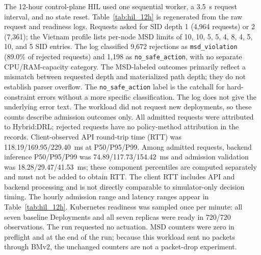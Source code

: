 \documentclass[final,5p]{elsarticle}
\newcommand{\rev}[1]{\textcolor{revisiongreen}{#1}}
\let\newrev\rev
\begin{document}
\newrev{The 12-hour control-plane HIL used one sequential worker, a 3.5~s request interval, and no state reset. Table~\ref{tab:hil_12h} is regenerated from the raw request and readiness logs. Requests asked for SID depth 1 (4,964 requests) or 2 (7,361); the Vietnam profile lists per-node MSD limits of 10, 10, 5, 5, 4, 8, 4, 5, 10, and 5 SID entries. The log classified 9,672 rejections as \texttt{msd\_violation} (89.0\% of rejected requests) and 1,198 as \texttt{no\_safe\_action}, with no separate CPU/RAM-capacity category. The MSD-labeled outcomes primarily reflect a mismatch between requested depth and materialized path depth; they do not establish parser overflow. The \texttt{no\_safe\_action} label is the catchall for hard-constraint errors without a more specific classification. The log does not give the underlying error text. The workload did not request new deployments, so these counts describe admission outcomes only. All admitted requests were attributed to Hybrid:DRL; rejected requests have no policy-method attribution in the records. Client-observed API round-trip time (RTT) was 118.19/169.95/229.40~ms at P50/P95/P99. Among admitted requests, backend inference P50/P95/P99 was 74.89/117.73/154.42~ms and admission validation was 18.28/29.47/41.53~ms; these component percentiles are computed separately and must not be added to obtain RTT. The client RTT includes API and backend processing and is not directly comparable to simulator-only decision timing. The hourly admission range and latency ranges appear in Table~\ref{tab:hil_12h}. Kubernetes readiness was sampled once per minute: all seven baseline Deployments and all seven replicas were ready in 720/720 observations. The run requested no actuation. MSD counters were zero in preflight and at the end of the run; because this workload sent no packets through BMv2, the unchanged counters are not a packet-drop experiment.}

\begin{table}[t]
\centering
\caption{\newrev{Control-plane HIL summary. Counts and percent denominators are derived from the request log; readiness counts use the 60-second Kubernetes samples.}}
\label{tab:hil_12h}
{\color{revisiongreen}
\small

}
\end{table}
\end{document}
